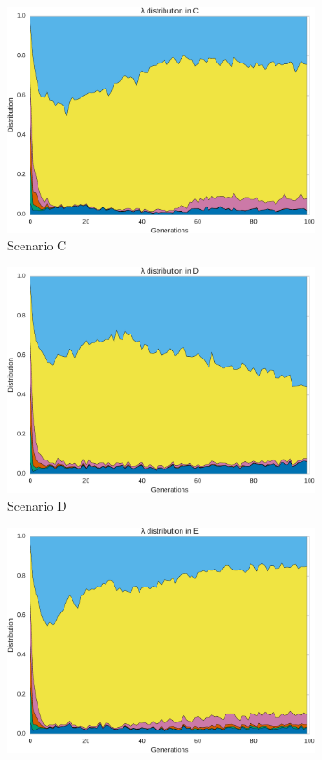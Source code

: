 \begin{figure}
\begin{subfigure}[t]{.49\columnwidth}
\includegraphics[width=\columnwidth]{fig/lambda_C}
\caption{Scenario C}
\label{fig:lambda_C}
\end{subfigure}
\begin{subfigure}[t]{.49\columnwidth}
\centering
\includegraphics[width=\columnwidth]{fig/lambda_D}
\caption{Scenario D}
\label{fig:lambda_D}
\end{subfigure}
\begin{subfigure}[t]{.49\columnwidth}
\centering
\includegraphics[width=\columnwidth]{fig/lambda_E}

\end{subfigure}
\end{figure}
